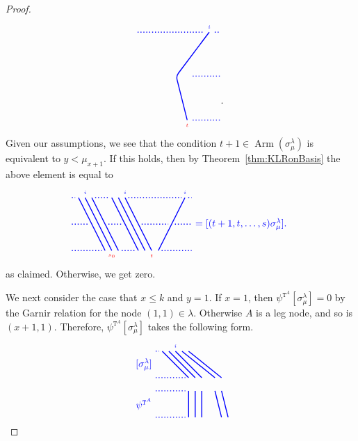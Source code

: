 \documentclass[twoside,11pt,reqno,letter]{amsart}
\numberwithin{equation}{section}
\theoremstyle{definition}  %
\newcommand{\Arm}{\operatorname{Arm}}
\newcommand{\0}{{\bar 0}}
\newcommand{\1}{{\bar 1}}
\newcommand{\la}{\lambda}
\newcommand{\si}{\sigma}
\def\T{{\mathtt T}}
\newenvironment{braid}{%
  \begin{tikzpicture}[baseline=6mm,blue,line width=1pt, scale=0.4,
                      draw/.append style={rounded corners},
                      every node/.append style={font=\tiny}]%
  }{\end{tikzpicture}
}
\begin{document}
{\begin{proof}
\[\begin{braid}
    \draw[dotted](7.5,8)--(13.5,8);
    \draw(14,8)node[above]{$i$}--(11,4)--(12,0)node[below,color=red]{$t$};
    \draw[dotted](14.5,8)--(15,8);
    \draw[dotted](12.5,4)--(15,4);
    \draw[dotted](12.5,0)--(15,0);
  \end{braid}.
\]
Given our assumptions, we see that the condition $t+1 \in \Arm(\si^\la_\mu)$ is equivalent to $y < \mu_{x+1}$. If this holds, then by Theorem~\ref{thm:KLRonBasis} the above element is equal to 
\[
  \begin{braid}\tikzset{scale=0.6,baseline=12mm}
    \draw[dotted](0,8)--(0.5,8);
    \draw[dotted](0,4)--(2.5,4);
    \draw[dotted](0,0)--(4.5,0);
    \draw(1,8)--(5,0);
    \draw(2,8)node[above]{$i$}--(6,0)node[below,color=red]{$s_0$};
    \draw(3,8)--(7,0);
    \draw[dotted](3.5,8)--(5.5,8);
    \draw[dotted](5.5,4)--(7.5,4);
    \draw[dotted](7.5,0)--(9.5,0);
    \draw(6,8)--(10,0);
    \draw(7,8)--(11,0);
    \draw(8,8)node[above]{$i$}--(12,0)node[below,color=red]{$t$};
    \draw[dotted](8.5,8)--(16.5,8);
    \draw[dotted](10.5,4)--(14.5,4);
    \draw(17,8)node[above]{$i$}--(13,0);
    \draw[dotted](17.5,8)--(18,8);
    \draw[dotted](15.5,4)--(18,4);
    \draw[dotted](13.5,0)--(18,0);
  \end{braid}
  \begin{braid}\tikzset{scale=0.6,baseline=12mm}
    \draw(0,4)node[font=\normalsize]{$=[(t+1, t, \dots, s) \si^\la_\mu]$.};
  \end{braid}
\]
as claimed. Otherwise, we get zero.





  We next consider the case that $x \leq k$ and $y = 1$. If $x = 1$, then $\psi^{\T^A} [\si^\la_\mu] = 0$ by the Garnir relation for the node $(1,1) \in \la$. Otherwise $A$ is a leg node, and so is $(x+1, 1)$. Therefore, $\psi^{\T^A} [\si^\la_\mu]$ takes the following form.
\[
  \begin{braid}\tikzset{scale=0.6,baseline=12mm}
    \draw(-2,8)node[left,font=\normalsize]{$[\si^\la_\mu]$};
    \draw(-2,2)node[left,font=\normalsize]{$\psi^{\T^A}$};

    \draw[dotted](-2,10)--(-1.5,10);
    \draw[dotted](-2,6)--(2.5,6);
    \draw[dotted](-2,4)--(2.5,4);
    \draw[dotted](-2,0)--(2.5,0);

    \draw(-1,10)--(3,6); \draw(3,4)--(3,0);
    \draw(0,10)--(4,6); \draw(4,4)--(4,0);
    \draw(1,10)node[above]{$i$}--(5,6); \draw(5,4)--(5,0);
    \draw(2,10)--(7,6); \draw(7,4)--(8,0);
    \draw(3,10)--(8,6); \draw(8,4)--(9,0);


\end{braid}\]
\end{proof}}
\end{document}

